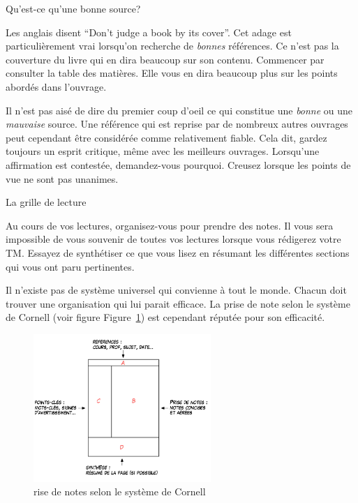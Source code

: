 \documentclass[
  a4paper,
]{book}
\makeatletter
\renewcommand{\section}{\@startsection{section}{1}{\z@}
{-4ex \@plus -1ex \@minus -.4ex}
{1ex \@plus.2ex }
{\normalfont\large\sffamily\bfseries}}
\renewcommand{\subsection}{\@startsection {subsection}{2}{\z@}
{-3ex \@plus -0.1ex \@minus -.4ex}
{0.5ex \@plus.2ex }
{\normalfont\sffamily\bfseries}}
\newlength\esp
\makeatother
\begin{document}
\hypertarget{quest-ce-quune-bonne-source}{%
\subsection{Qu'est-ce qu'une bonne
source?}\label{quest-ce-quune-bonne-source}}

Les anglais disent ``Don't judge a book by its cover''. Cet adage est
particulièrement vrai lorsqu'on recherche de \emph{bonnes} références.
Ce n'est pas la couverture du livre qui en dira beaucoup sur son
contenu. Commencer par consulter la table des matières. Elle vous en
dira beaucoup plus sur les points abordés dans l'ouvrage.

Il n'est pas aisé de dire du premier coup d'oeil ce qui constitue une
\emph{bonne} ou une \emph{mauvaise} source. Une référence qui est
reprise par de nombreux autres ouvrages peut cependant être considérée
comme relativement fiable. Cela dit, gardez toujours un esprit critique,
même avec les meilleurs ouvrages. Lorsqu'une affirmation est contestée,
demandez-vous pourquoi. Creusez lorsque les points de vue ne sont pas
unanimes.

\hypertarget{la-grille-de-lecture}{%
\section{La grille de lecture}\label{la-grille-de-lecture}}

Au cours de vos lectures, organisez-vous pour prendre des notes. Il vous
sera impossible de vous souvenir de toutes vos lectures lorsque vous
rédigerez votre TM. Essayez de synthétiser ce que vous lisez en résumant
les différentes sections qui vous ont paru pertinentes.

Il n'existe pas de système universel qui convienne à tout le monde.
Chacun doit trouver une organisation qui lui parait efficace. La prise
de note selon le système de Cornell (voir figure
Figure~\ref{fig-cornell}) est cependant réputée pour son efficacité.

\begin{figure}

{\centering \includegraphics[width=0.6\textwidth,height=\textheight]{chapters/../pictures/cornell.png}

}

\caption{\label{fig-cornell}rise de notes selon le système de Cornell}

\end{figure}
\end{document}
